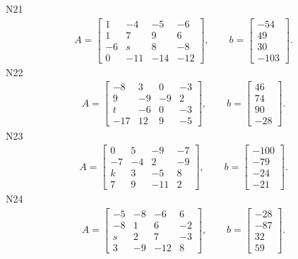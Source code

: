 \documentclass[11pt]{report}
\begin{document}
N21
\begin{align*}
 A = \left[\begin{matrix}1 & -4 & -5 & -6\\1 & 7 & 9 & 6\\-6 & s & 8 & -8\\0 & -11 & -14 & -12\end{matrix}\right],
\qquad b = \left[\begin{matrix}-54\\49\\30\\-103\end{matrix}\right]. 
 \end{align*}
N22
\begin{align*}
 A = \left[\begin{matrix}-8 & 3 & 0 & -3\\9 & -9 & -9 & 2\\t & -6 & 0 & -3\\-17 & 12 & 9 & -5\end{matrix}\right],
\qquad b = \left[\begin{matrix}46\\74\\90\\-28\end{matrix}\right]. 
 \end{align*}
N23
\begin{align*}
 A = \left[\begin{matrix}0 & 5 & -9 & -7\\-7 & -4 & 2 & -9\\k & 3 & -5 & 8\\7 & 9 & -11 & 2\end{matrix}\right],
\qquad b = \left[\begin{matrix}-100\\-79\\-24\\-21\end{matrix}\right]. 
 \end{align*}
N24
\begin{align*}
 A = \left[\begin{matrix}-5 & -8 & -6 & 6\\-8 & 1 & 6 & -2\\s & 2 & 7 & -3\\3 & -9 & -12 & 8\end{matrix}\right],
\qquad b = \left[\begin{matrix}-28\\-87\\32\\59\end{matrix}\right]. 
 \end{align*}
\end{document}
